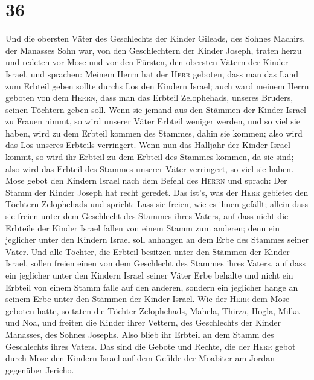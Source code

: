 \hypertarget{section-35}{%
\section{36}\label{section-35}}

 Und die obersten Väter des Geschlechts der Kinder
Gileads, des Sohnes Machirs, der Manasses Sohn war, von den
Geschlechtern der Kinder Joseph, traten herzu und redeten vor Mose und
vor den Fürsten, den obersten Vätern der Kinder Israel, 
und sprachen: Meinem Herrn hat der \textsc{Herr} geboten, dass man das
Land zum Erbteil geben sollte durchs Los den Kindern Israel; auch ward
meinem Herrn geboten von dem \textsc{Herrn}, dass man das Erbteil
Zelophehads, unseres Bruders, seinen Töchtern geben soll. 
Wenn sie jemand aus den Stämmen der Kinder Israel zu Frauen nimmt, so
wird unserer Väter Erbteil weniger werden, und so viel sie haben, wird
zu dem Erbteil kommen des Stammes, dahin sie kommen; also wird das Los
unseres Erbteils verringert.  Wenn nun das Halljahr der
Kinder Israel kommt, so wird ihr Erbteil zu dem Erbteil des Stammes
kommen, da sie sind; also wird das Erbteil des Stammes unserer Väter
verringert, so viel sie haben.  Mose gebot den Kindern
Israel nach dem Befehl des \textsc{Herrn} und sprach: Der Stamm der
Kinder Joseph hat recht geredet.  Das ist's, was der
\textsc{Herr} gebietet den Töchtern Zelophehads und spricht: Lass sie
freien, wie es ihnen gefällt; allein dass sie freien unter dem
Geschlecht des Stammes ihres Vaters,  auf dass nicht die
Erbteile der Kinder Israel fallen von einem Stamm zum anderen; denn ein
jeglicher unter den Kindern Israel soll anhangen an dem Erbe des Stammes
seiner Väter.  Und alle Töchter, die Erbteil besitzen
unter den Stämmen der Kinder Israel, sollen freien einen von dem
Geschlecht des Stammes ihres Vaters, auf dass ein jeglicher unter den
Kindern Israel seiner Väter Erbe behalte  und nicht ein
Erbteil von einem Stamm falle auf den anderen, sondern ein jeglicher
hange an seinem Erbe unter den Stämmen der Kinder Israel.
 Wie der \textsc{Herr} dem Mose geboten hatte, so taten
die Töchter Zelophehads,  Mahela, Thirza, Hogla, Milka
und Noa, und freiten die Kinder ihrer Vettern,  des
Geschlechts der Kinder Manasses, des Sohnes Josephs. Also blieb ihr
Erbteil an dem Stamm des Geschlechts ihres Vaters.  Das
sind die Gebote und Rechte, die der \textsc{Herr} gebot durch Mose den
Kindern Israel auf dem Gefilde der Moabiter am Jordan gegenüber Jericho.
